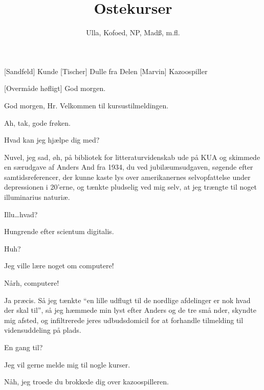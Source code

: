 \documentclass[a4paper,11pt]{article}
\title{Ostekurser}
\author{Ulla, Kofoed, NP, Mad\ss , m.fl.}
\begin{document}
\maketitle

\begin{roles}
[Sandfeld] Kunde
[Tischer] Dulle fra Delen
[Marvin] Kazoospiller

\end{roles}

\begin{props}
\end{props}

  
\begin{sketch}

 
  [Overmåde høfligt] God morgen.

   God morgen, Hr. Velkommen til kursustilmeldingen.

   Ah, tak, gode frøken.

   Hvad kan jeg hjælpe dig med?

   Nuvel, jeg sad, øh, på bibliotek for litteraturvidenskab ude på KUA og
  skimmede en særudgave af Anders And fra 1934, du ved jubilæumsudgaven, søgende
  efter samtidsreferencer, der kunne kaste lys over amerikanernes selvopfattelse
  under depressionen i 20'erne, og tænkte pludselig ved mig selv, at jeg trængte
  til noget illuminarius naturiæ.

   Illu\ldots hvad?

   Hungrende efter scientum digitalis.

   Huh?

   Jeg ville lære noget om computere!

   Nårh, computere!

   Ja præcis. Så jeg tænkte ``en lille udflugt til de nordlige afdelinger
  er nok hvad der skal til'', så jeg hæmmede min lyst efter Anders og de tre små
  nder, skyndte mig afsted, og infiltrerede jeres udbudsdomicil for at forhandle
  tilmelding til vidensuddeling på plads.

   En gang til?

   Jeg vil gerne melde mig til nogle kurser.

   Nåh, jeg troede du brokkede dig over kazoospilleren.


\end{sketch}
\end{document}
